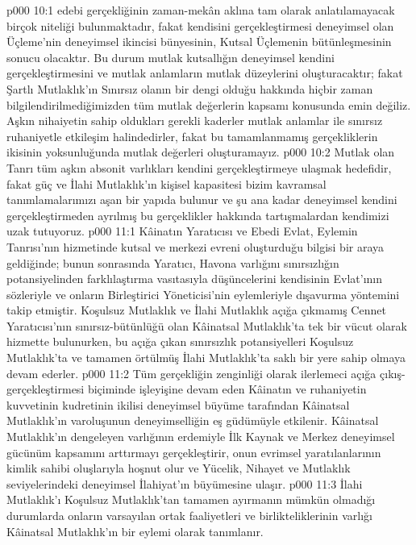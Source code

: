 \vs p000 10:1   edebi gerçekliğinin zaman\hyp{}mekân aklına tam olarak anlatılamayacak birçok niteliği bulunmaktadır, fakat  kendisini gerçekleştirmesi deneyimsel olan Üçleme’nin deneyimsel ikincisi bünyesinin, Kutsal Üçlemenin bütünleşmesinin sonucu olacaktır. Bu durum mutlak kutsallığın deneyimsel kendini gerçekleştirmesini ve mutlak anlamların mutlak düzeylerini oluşturacaktır; fakat Şartlı Mutlaklık’ın Sınırsız olanın bir dengi olduğu hakkında hiçbir zaman bilgilendirilmediğimizden tüm mutlak değerlerin kapsamı konusunda emin değiliz. Aşkın nihaiyetin sahip oldukları gerekli kaderler mutlak anlamlar ile sınırsız ruhaniyetle etkileşim halindedirler, fakat bu tamamlanmamış gerçekliklerin ikisinin yoksunluğunda mutlak değerleri oluşturamayız.
\vs p000 10:2 Mutlak olan Tanrı tüm aşkın absonit varlıkları kendini gerçekleştirmeye ulaşmak hedefidir, fakat güç ve İlahi Mutlaklık’ın kişisel kapasitesi bizim kavramsal tanımlamalarımızı aşan bir yapıda bulunur ve şu ana kadar deneyimsel kendini gerçekleştirmeden ayrılmış bu gerçeklikler hakkında tartışmalardan kendimizi uzak tutuyoruz.
\vs p000 11:1 Kâinatın Yaratıcısı ve Ebedi Evlat, Eylemin Tanrısı’nın hizmetinde kutsal ve merkezi evreni oluşturduğu bilgisi bir araya geldiğinde; bunun sonrasında Yaratıcı, Havona varlığını sınırsızlığın potansiyelinden farklılaştırma vasıtasıyla düşüncelerini kendisinin Evlat’ının sözleriyle ve onların Birleştirici Yöneticisi’nin eylemleriyle dışavurma yöntemini takip etmiştir. Koşulsuz Mutlaklık ve İlahi Mutlaklık açığa çıkmamış Cennet Yaratıcısı’nın sınırsız\hyp{}bütünlüğü olan Kâinatsal Mutlaklık’ta tek bir vücut olarak hizmette bulunurken, bu açığa çıkan sınırsızlık potansiyelleri Koşulsuz Mutlaklık'ta ve tamamen örtülmüş İlahi Mutlaklık'ta saklı bir yere sahip olmaya devam ederler.
\vs p000 11:2 Tüm gerçekliğin zenginliği olarak ilerlemeci açığa çıkış\hyp{}gerçekleştirmesi biçiminde işleyişine devam eden Kâinatın ve ruhaniyetin kuvvetinin kudretinin ikilisi deneyimsel büyüme tarafından Kâinatsal Mutlaklık’ın varoluşunun deneyimselliğin eş güdümüyle etkilenir. Kâinatsal Mutlaklık’ın dengeleyen varlığının erdemiyle İlk Kaynak ve Merkez deneyimsel gücünüm kapsamını arttırmayı gerçekleştirir, onun evrimsel yaratılanlarının kimlik sahibi oluşlarıyla hoşnut olur ve Yücelik, Nihayet ve Mutlaklık seviyelerindeki deneyimsel İlahiyat’ın büyümesine ulaşır.
\vs p000 11:3 İlahi Mutlaklık’ı Koşulsuz Mutlaklık'tan tamamen ayırmanın mümkün olmadığı durumlarda onların varsayılan ortak faaliyetleri ve birlikteliklerinin varlığı Kâinatsal Mutlaklık’ın bir eylemi olarak tanımlanır.
